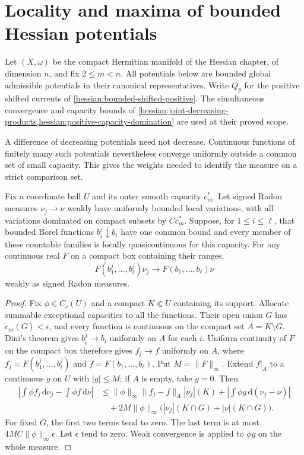 \section{Locality and maxima of bounded Hessian potentials}
\label{draft625:locality}

Let $(X,\omega)$ be the compact Hermitian manifold of the Hessian
chapter, of dimension $n$, and fix $2\leq m<n$. All potentials below
are bounded global admissible potentials in their canonical
representatives. Write $Q_p$ for the positive shifted currents of
\cref{hessian:bounded-shifted-positive}. The simultaneous convergence
and capacity bounds of \cref{hessian:joint-decreasing-products,hessian:positive-capacity-domination}
are used at their proved scope.

A difference of decreasing potentials need not decrease. Continuous
functions of finitely many such potentials nevertheless converge
uniformly outside a common set of small capacity. This gives the
weights needed to identify the measure on a strict comparison set.

\begin{lemma}\label{draft625:continuous-weights}
Fix a coordinate ball $U$ and its outer smooth capacity $c_m^*$.
Let signed Radon measures $\nu_j\to\nu$ weakly have uniformly bounded
local variations, with all variations dominated on compact subsets
by $C c_m^*$. Suppose, for $1\leq i\leq\ell$, that bounded Borel
functions $b_i^j\downarrow b_i$ have one common bound and every
member of these countable families is locally quasicontinuous for
this capacity. For any continuous real $F$ on a compact box
containing their ranges,
\[
 F(b_1^j,\ldots,b_\ell^j)\nu_j
       \longrightarrow F(b_1,\ldots,b_\ell)\nu
\]
weakly as signed Radon measures.
\end{lemma}
\begin{proof}
Fix $\phi\in C_c(U)$ and a compact $K\Subset U$ containing its
support. Allocate summable exceptional capacities to all the
functions. Their open union $G$ has $c_m(G)<\epsilon$, and every
function is continuous on the compact set $A=K\setminus G$.
Dini's theorem gives $b_i^j\to b_i$ uniformly on $A$ for each $i$.
Uniform continuity of $F$ on the compact box therefore gives
$f_j\to f$ uniformly on $A$, where
$f_j=F(b_1^j,\ldots,b_\ell^j)$ and $f=F(b_1,\ldots,b_\ell)$.
Put $M=\|F\|_\infty$. Extend $f|_A$ to a continuous $g$ on $U$
with $|g|\leq M$; if $A$ is empty, take $g=0$.
Then
\[
\begin{aligned}
 \left|\int\phi f_j\,\mathrm d\nu_j-
                 \int\phi f\,\mathrm d\nu\right|
 &\leq \|\phi\|_\infty\|f_j-f\|_A|\nu_j|(K)
       +\left|\int\phi g\,\mathrm d(\nu_j-\nu)\right|\\
 &\quad+2M\|\phi\|_\infty
            \bigl(|\nu_j|(K\cap G)+|\nu|(K\cap G)\bigr).
\end{aligned}
\]
For fixed $G$, the first two terms tend to zero. The last term is
at most $4MC\|\phi\|_\infty\epsilon$. Let $\epsilon$ tend to zero.
Weak convergence is applied to $\phi g$ on the whole measure.
\end{proof}

